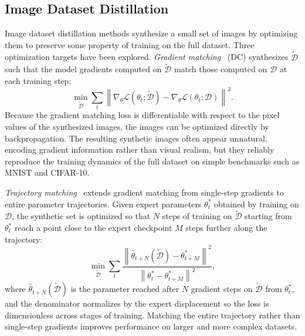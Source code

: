 \subsection{Image Dataset Distillation} \label{sec:26-background-datasetdistill-imagedd}
\begin{foldable}
  Image dataset distillation methods synthesize a small set of images by optimizing them to preserve some property of training on the full dataset.
  Three optimization targets have been explored.
  \textit{Gradient matching}~\cite{zhao2021dataset} (DC) synthesizes $\tilde{\mathcal{D}}$ such that the model gradients computed on $\tilde{\mathcal{D}}$ match those computed on $\mathcal{D}$ at each training step:
  \begin{equation}
    \min_{\tilde{\mathcal{D}}} \sum_{t} \left\| \nabla_\theta \mathcal{L}(\theta_t;
    \tilde{\mathcal{D}}) - \nabla_\theta \mathcal{L}(\theta_t; \mathcal{D}) \right\|^2.
    \label{eq:dc-objective}
  \end{equation}
  Because the gradient matching loss is differentiable with respect to the pixel values of the synthesized images, the images can be optimized directly by backpropagation.
  The resulting synthetic images often appear unnatural, encoding gradient information rather than visual realism, but they reliably reproduce the training dynamics of the full dataset on simple benchmarks such as MNIST and CIFAR-10.
\end{foldable}

\begin{foldable}
  \textit{Trajectory matching}~\cite{cazenavette2022dataset,kim2022dataset} extends gradient matching from single-step gradients to entire parameter trajectories.
  Given expert parameters $\theta^*_t$ obtained by training on $\mathcal{D}$, the synthetic set is optimized so that $N$ steps of training on $\tilde{\mathcal{D}}$ starting from $\theta^*_t$ reach a point close to the expert checkpoint $M$ steps further along the trajectory:
  \begin{equation}
    \min_{\tilde{\mathcal{D}}} \sum_{t} \frac{\left\| \hat\theta_{t+N}(\tilde{\mathcal{D}}) - \theta^*_{t+M} \right\|^2}{\left\| \theta^*_t - \theta^*_{t+M} \right\|^2},
    \label{eq:mtt-objective}
  \end{equation}
  where $\hat\theta_{t+N}(\tilde{\mathcal{D}})$ is the parameter reached after $N$ gradient steps on $\tilde{\mathcal{D}}$ from $\theta^*_t$, and the denominator normalizes by the expert displacement so the loss is dimensionless across stages of training.
  Matching the entire trajectory rather than single-step gradients improves performance on larger and more complex datasets.
\end{foldable}

